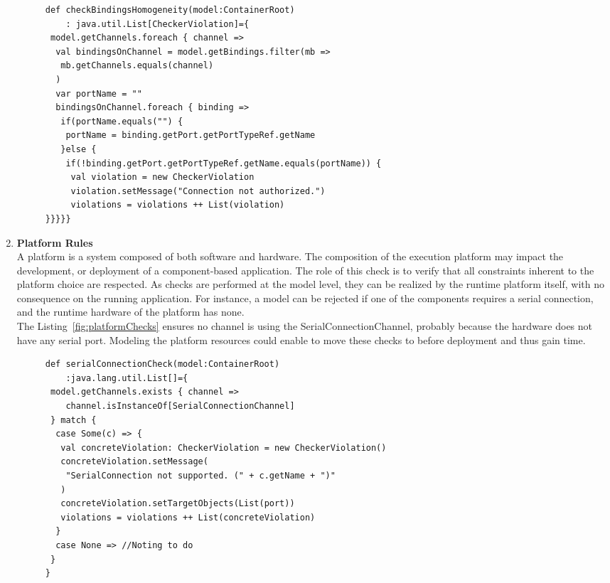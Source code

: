 \begin{enumerate}
\begin{figure}[h!]
\vspace{-0,3cm}
\centering
\begin{lstlisting}[caption=Example checking identical port names,label=fig:checkBusiness,basicstyle=\scriptsize\ttfamily,tabsize=1 ]
def checkBindingsHomogeneity(model:ContainerRoot)
	: java.util.List[CheckerViolation]={
 model.getChannels.foreach { channel =>
  val bindingsOnChannel = model.getBindings.filter(mb =>
   mb.getChannels.equals(channel)
  )
  var portName = ""
  bindingsOnChannel.foreach { binding =>
   if(portName.equals("") {
    portName = binding.getPort.getPortTypeRef.getName
   }else {
    if(!binding.getPort.getPortTypeRef.getName.equals(portName)) {
  	 val violation = new CheckerViolation
     violation.setMessage("Connection not authorized.")
     violations = violations ++ List(violation)
}}}}}
\end{lstlisting} 
\vspace{-0,4cm}
\end{figure}

\item {\bf Platform Rules}\\
A platform is a system composed of both software and hardware. The composition of the execution platform may impact the development, or deployment of a component-based application. The role of this check is to verify that all constraints inherent to the platform choice are respected. As checks are performed at the model level, they can be realized by the runtime platform itself, with no consequence on the running application. For instance, a model can be rejected if one of the components requires a serial connection, and the runtime hardware of the platform has none.\\
The Listing~\ref{fig:platformChecks} ensures no channel is using the SerialConnectionChannel, probably because the hardware does not have any serial port. Modeling the platform resources could enable to move these checks to before deployment and thus gain time.

\begin{figure}[h!]
\centering
\begin{lstlisting}[caption=Example checking pre-deploy constraints,label=fig:platformChecks,basicstyle=\scriptsize\ttfamily,tabsize=1 ]
def serialConnectionCheck(model:ContainerRoot)
	:java.lang.util.List[]={
 model.getChannels.exists { channel =>
 	channel.isInstanceOf[SerialConnectionChannel]
 } match {
  case Some(c) => {
   val concreteViolation: CheckerViolation = new CheckerViolation()
   concreteViolation.setMessage(
    "SerialConnection not supported. (" + c.getName + ")"
   )
   concreteViolation.setTargetObjects(List(port))
   violations = violations ++ List(concreteViolation)	
  }
  case None => //Noting to do
 }
}
\end{lstlisting} 
\vspace{-0,3cm}
\end{figure}


\end{enumerate}
